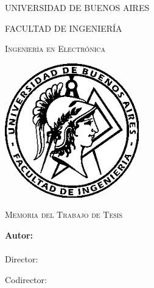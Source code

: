 \documentclass[
11pt, %
spanish,
singlespacing, %
parskip, %
headsepline, %
]{MastersDoctoralThesis} %
\author{Andrés Dario Cassagnes} %
\begin{document}
\frontmatter %

\pagestyle{plain} %


\begin{titlepage}
\begin{center}

{\scshape\LARGE UNIVERSIDAD DE BUENOS AIRES\par}\vspace{0.1cm} %
{\scshape\LARGE FACULTAD DE INGENIERÍA\par}\vspace{0.1cm} %
{\scshape\LARGE Ingeniería en Electrónica\par}\vspace{1cm} %

\includegraphics[width=.3\textwidth]{./figures/logoFIUBA.png}
\vspace{1cm}

\textsc{\Large Memoria del Trabajo de Tesis}\\[0.5cm] %

{\huge \bfseries \ttitle\par}\vspace{0.4cm} %

\vspace{1cm}
\LARGE\textbf{Autor:\\
\authorname}\\ %


\large
\vspace{10px}
{Director:} \\
{\supname} %

\large
\vspace{10px}
{Codirector:} \\
{\cosupname} %


\end{center}
\end{titlepage}
\end{document}
